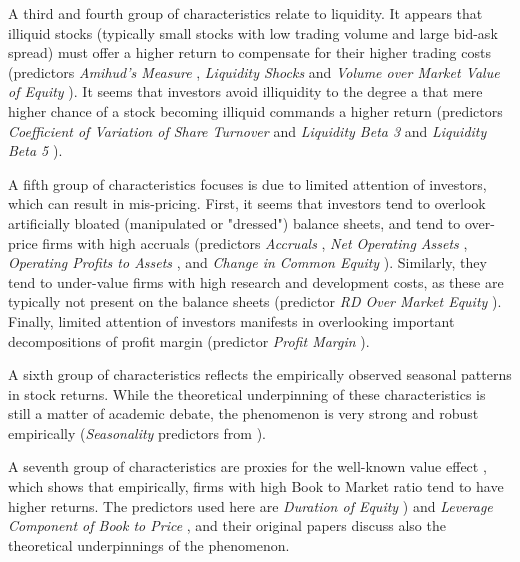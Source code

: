 			A third and fourth group of characteristics relate to liquidity. It appears that illiquid stocks (typically small stocks with low trading volume and large bid-ask spread) must offer a higher return to compensate for their higher trading costs (predictors \textit{Amihud's Measure} \citep{amihud2002illiquidity}, \textit{Liquidity Shocks} \citep{bali2013liquidity} and \textit{Volume over Market Value of Equity}  \citep{haugen1996commonality}). It seems that investors avoid illiquidity to the degree a that mere higher chance of a stock becoming illiquid commands a higher return (predictors \textit{Coefficient of Variation of Share Turnover} \citep{chordia2001trading} and \textit{Liquidity Beta 3} and \textit{Liquidity Beta 5}  \citep{acharya2005asset}).  
			
			A fifth group of characteristics focuses is due to limited attention of investors, which can result in mis-pricing. First, it seems that investors tend to overlook artificially bloated (manipulated or "dressed") balance sheets, and tend to over-price firms with high accruals (predictors \textit{Accruals} \citep{sloan1996create}, \textit{Net Operating Assets} \citep{hirshleifer2004investors}, \textit{Operating Profits to Assets} \citep{ball2016accruals}, and \textit{Change in Common Equity} \citep{richardson2006implications}). Similarly, they tend to under-value firms with high research and development costs, as these are typically not present on the balance sheets (predictor \textit{ RD Over Market Equity} \citep{chan2001stock}). Finally, limited attention of investors manifests in overlooking important decompositions of profit margin (predictor \textit{Profit Margin} \citep{soliman2008use}).
			
			A sixth group of characteristics reflects the empirically observed seasonal patterns in stock returns. While the theoretical underpinning of these characteristics is still a matter of academic debate, the phenomenon is very strong and robust empirically (\textit{Seasonality} predictors from \cite{heston2008seasonality}). 
			
			A seventh group of characteristics are proxies for the well-known value effect \cite{fama1993common}, which shows that empirically, firms with high Book to Market ratio tend to have higher returns. The predictors used here are \textit{ Duration of Equity }\citep{dechow2004implied}) and \textit{Leverage Component of Book to Price} \citep{penman2007book}, and their original papers discuss also the theoretical underpinnings of the phenomenon.
			
